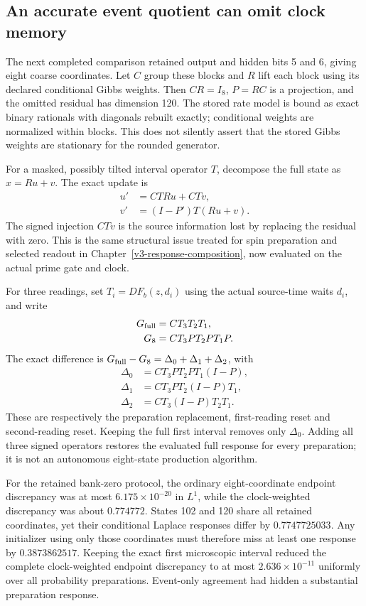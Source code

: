 \subsection{An accurate event quotient can omit clock memory}

The next completed comparison retained output and hidden bits 5 and 6, giving eight coarse coordinates. Let $C$ group these blocks and $R$ lift each block using its declared conditional Gibbs weights. Then $CR=I_8$, $P=RC$ is a projection, and the omitted residual has dimension 120. The stored rate model is bound as exact binary rationals with diagonals rebuilt exactly; conditional weights are normalized within blocks. This does not silently assert that the stored Gibbs weights are stationary for the rounded generator.

For a masked, possibly tilted interval operator $T$, decompose the full state as $x=Ru+v$. The exact update is
\begin{align*}
 u'&=CTR u+CTv,\\
 v'&=(I-P')T(Ru+v).
\end{align*}
The signed injection $CTv$ is the source information lost by replacing the residual with zero. This is the same structural issue treated for spin preparation and selected readout in Chapter~\ref{v3-response-composition}, now evaluated on the actual prime gate and clock.

For three readings, set $T_i=D F_b(z,d_i)$ using the actual source-time waits $d_i$, and write
\begin{align*}
 G_{\rm full}&=CT_3T_2T_1,\\
 G_8&=CT_3PT_2PT_1P.
\end{align*}
The exact difference is $G_{\rm full}-G_8=\Delta_0+\Delta_1+\Delta_2$, with
\begin{align*}
 \Delta_0&=CT_3PT_2PT_1(I-P),\\
 \Delta_1&=CT_3PT_2(I-P)T_1,\\
 \Delta_2&=CT_3(I-P)T_2T_1.
\end{align*}
These are respectively the preparation replacement, first-reading reset and second-reading reset. Keeping the full first interval removes only $\Delta_0$. Adding all three signed operators restores the evaluated full response for every preparation; it is not an autonomous eight-state production algorithm.

For the retained bank-zero protocol, the ordinary eight-coordinate endpoint discrepancy was at most $6.175\times10^{-20}$ in $L^1$, while the clock-weighted discrepancy was about $0.774772$. States 102 and 120 share all retained coordinates, yet their conditional Laplace responses differ by $0.7747725033$. Any initializer using only those coordinates must therefore miss at least one response by $0.3873862517$. Keeping the exact first microscopic interval reduced the complete clock-weighted endpoint discrepancy to at most $2.636\times10^{-11}$ uniformly over all probability preparations. Event-only agreement had hidden a substantial preparation response.

